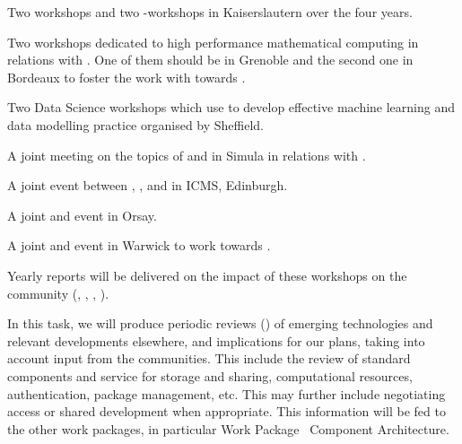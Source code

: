 \begin{workpackage}
\begin{tasklist}
\begin{task}[title=Community Building: Development Workshops, lead=PS,PM=24, partners={UB,UK,SR,SA,USH}, id=devel-workshops, wphases=0-48]
\begin{compactitem}
\item Two \Singular workshops and two \GAP-\Singular workshops in Kaiserslautern
  over the four years.

\item Two workshops dedicated to high performance mathematical
  computing in relations with . One of them should be in
  Grenoble and the second one in Bordeaux to foster the work with
  \Pari towards .

\item Two Data Science workshops which use \TheProject to develop effective machine learning and data modelling practice organised by Sheffield.

\item A joint meeting on the topics of \SMC and \Jupyter in Simula in
  relations with .

\item A joint event between \GAP, \Sage, and \Singular in ICMS,
  Edinburgh.

\item A joint \Jupyter and \Sage event in Orsay.

\item A joint \LMFDB and \Sage event in Warwick to work towards
  .

\end{compactitem}

Yearly reports will be delivered on the impact of these workshops on the community (, , , ).

\end{task}


\begin{task}[title=Reviewing emerging technologies, id=tech-review, lead=PS, partners={SA,USO,USH,US,UV,UB,SR},PM=11, wphases=0-48]
  In this task, we will produce periodic reviews () of emerging
  technologies and relevant developments elsewhere, and implications
  for our plans, taking into account input from the communities. This
  include the review of standard components and service for storage
  and sharing, computational resources, authentication, package
  management, etc. This may further include negotiating access or
  shared development when appropriate. This information will be fed to
  the other work packages, in particular Work
  Package~ Component Architecture.
\end{task}



\end{tasklist}
\end{workpackage}
